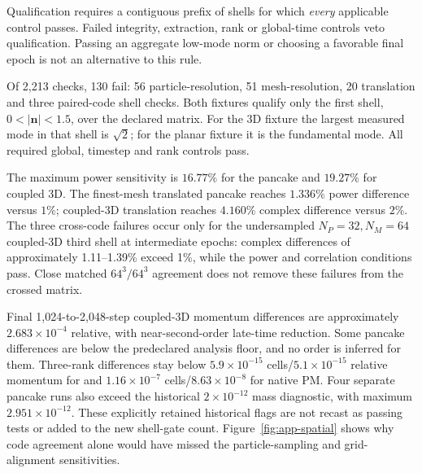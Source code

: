 Qualification requires a contiguous prefix of shells for which \emph{every}
applicable control passes.  Failed integrity, extraction, rank or global-time
controls veto qualification.  Passing an aggregate low-mode norm or choosing a
favorable final epoch is not an alternative to this rule.

Of 2,213 checks, 130 fail: 56 particle-resolution, 51 mesh-resolution,
20 translation and three paired-code shell checks.  Both fixtures qualify only
the first shell, $0<|\boldsymbol n|<1.5$, over the declared matrix.
For the 3D fixture the largest measured mode in that shell is $\sqrt2$;
for the planar fixture it is the fundamental mode.  All required global,
timestep and rank controls pass.

The maximum power sensitivity is $16.77\%$ for the pancake and $19.27\%$ for
coupled 3D.  The finest-mesh translated pancake reaches $1.336\%$ power
difference versus $1\%$; coupled-3D translation reaches $4.160\%$ complex
difference versus $2\%$.  The three cross-code failures occur only for the
undersampled $N_P=32,N_M=64$ coupled-3D third shell at intermediate epochs:
complex differences of approximately 1.11--1.39\% exceed 1\%, while the power
and correlation conditions pass.  Close matched $64^3/64^3$ agreement does
not remove these failures from the crossed matrix.

Final 1,024-to-2,048-step coupled-3D momentum differences are approximately
$2.683\times10^{-4}$ relative, with near-second-order late-time reduction.
Some pancake differences are below the predeclared analysis floor, and no
order is inferred for them.  Three-rank differences stay below
$5.9\times10^{-15}$ cells/$5.1\times10^{-15}$ relative momentum for \IPPL
and $1.16\times10^{-7}$ cells/$8.63\times10^{-8}$ for native PM.
Four separate \IPPL pancake runs also exceed the historical $2\times10^{-12}$
mass diagnostic, with maximum $2.951\times10^{-12}$.  These explicitly retained
historical flags are not recast as passing tests or added to the new shell-gate
count.  Figure~\ref{fig:app-spatial} shows why code agreement alone would
have missed the particle-sampling and grid-alignment sensitivities.


